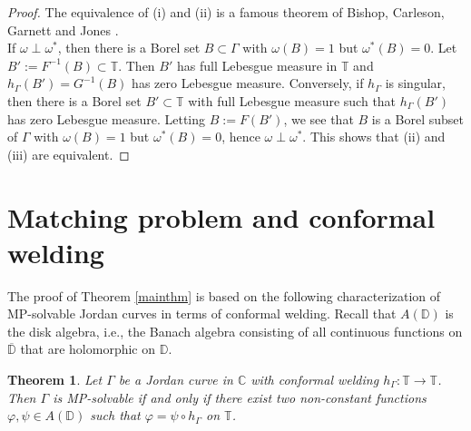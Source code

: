 \documentclass{amsart}
\theoremstyle{plain}
\newtheorem{theorem}{Theorem}[section]
\theoremstyle{definition}
\theoremstyle{remark}
\newcommand{\mC}{\mathbb{C}}
\newcommand{\mD}{\mathbb{D}}
\newcommand{\mT}{\mathbb{T}}
\begin{document}
\begin{proof}
The equivalence of (i) and (ii) is a famous theorem of Bishop, Carleson, Garnett and Jones \cite{BishopCarlesonGarnettJones1989}.
\\

If  $\omega \perp \omega^*$, then there is a Borel set $B \subset \Gamma$ with $\omega(B)=1$ but $\omega^*(B)=0$. Let $B':=F^{-1}(B) \subset \mT$. Then $B'$ has full Lebesgue measure in $\mT$ and $h_\Gamma(B')=G^{-1}(B)$ has zero Lebesgue measure. Conversely, if $h_\Gamma$ is singular, then there is a Borel set $B' \subset \mT$ with full Lebesgue measure such that $h_\Gamma(B')$ has zero Lebesgue measure. Letting $B:=F(B')$, we see that $B$ is a Borel subset of $\Gamma$ with $\omega(B)=1$ but $\omega^*(B)=0$, hence $\omega \perp \omega^*$. This shows that (ii) and (iii) are equivalent.
\end{proof}


\section{Matching problem and conformal welding}
\label{sec3}

The proof of Theorem \ref{mainthm} is based on the following characterization of MP-solvable Jordan curves in terms of conformal welding. Recall that $A(\mD)$ is the disk algebra, i.e., the Banach algebra consisting of all continuous functions on $\overline{\mD}$ that are holomorphic on $\mD$.

\begin{theorem}
\label{theorem:welding}
Let $\Gamma$ be a Jordan curve in $\mC$ with conformal welding $h_\Gamma: \mT \to \mT$. Then $\Gamma$ is MP-solvable if and only if there exist two non-constant functions $\varphi, \psi \in A(\mD)$ such that $\varphi = \psi \circ h_\Gamma$ on $\mT$.
\end{theorem}
\end{document}
